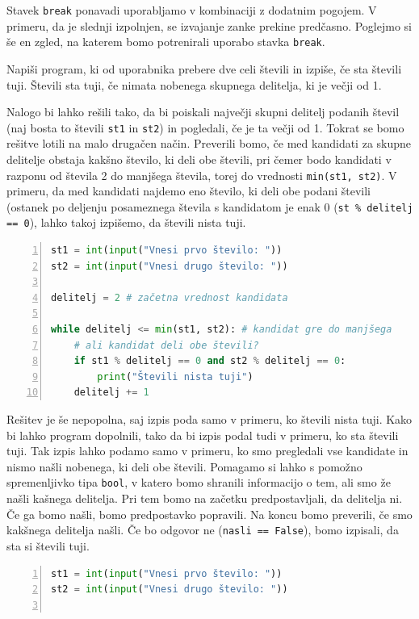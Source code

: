 Stavek \texttt{break} ponavadi uporabljamo v kombinaciji z dodatnim pogojem. V primeru, da je slednji izpolnjen, se izvajanje zanke prekine predčasno. Poglejmo si še en zgled, na katerem bomo potrenirali uporabo stavka \texttt{break}. 

\begin{zgled}
Napiši program, ki od uporabnika prebere dve celi števili in izpiše, če sta števili tuji. Števili sta tuji, če nimata nobenega skupnega delitelja, ki je večji od 1.
\end{zgled}
\begin{resitev}
Nalogo bi lahko rešili tako, da bi poiskali največji skupni delitelj podanih števil (naj bosta to števili \texttt{st1} in \texttt{st2}) in pogledali, če je ta večji od 1. Tokrat se bomo rešitve lotili na malo drugačen način. Preverili bomo, če med kandidati za skupne delitelje obstaja kakšno število, ki deli obe števili, pri čemer bodo kandidati v razponu od števila 2 do manjšega števila, torej do vrednosti \texttt{min(st1, st2)}. V primeru, da med kandidati najdemo eno število, ki deli obe podani števili (ostanek po deljenju posameznega števila s kandidatom je enak 0 (\texttt{st \% delitelj == 0}), lahko takoj izpišemo, da števili nista tuji.
\begin{lstlisting}[language=Python,numbers=left]
st1 = int(input("Vnesi prvo število: "))
st2 = int(input("Vnesi drugo število: "))

delitelj = 2 # začetna vrednost kandidata

while delitelj <= min(st1, st2): # kandidat gre do manjšega
    # ali kandidat deli obe števili?
    if st1 % delitelj == 0 and st2 % delitelj == 0:
        print("Števili nista tuji")
    delitelj += 1
\end{lstlisting}
Rešitev je še nepopolna, saj izpis poda samo v primeru, ko števili nista tuji. Kako bi lahko program dopolnili, tako da bi izpis podal tudi v primeru, ko sta števili tuji. Tak izpis lahko podamo samo v primeru, ko smo pregledali vse kandidate in nismo našli nobenega, ki deli obe števili. Pomagamo si lahko s pomožno spremenljivko tipa \texttt{bool}, v katero bomo shranili informacijo o tem, ali smo že našli kašnega delitelja. Pri tem bomo na začetku predpostavljali, da delitelja ni. Če ga bomo našli, bomo predpostavko popravili. Na koncu bomo preverili, če smo kakšnega delitelja našli. Če bo odgovor ne (\texttt{nasli == False}), bomo izpisali, da sta si števili tuji.
\begin{lstlisting}[language=Python,numbers=left]
st1 = int(input("Vnesi prvo število: "))
st2 = int(input("Vnesi drugo število: "))


\end{lstlisting}
\end{resitev}

